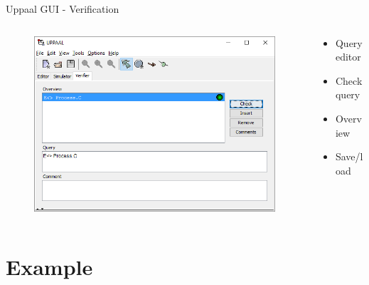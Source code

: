 \documentclass{beamer}
\begin{document}
\begin{frame}{Uppaal GUI - Verification}
	\vspace{-5mm}
	\begin{columns}
		\begin{column}{0.8\textwidth}
			\begin{figure}[H]
				\includegraphics[scale=0.55]{img/uppaal_gui_small_verification.png}
			\end{figure}
		\end{column}
		
		\begin{column}{0.35\textwidth}
			\begin{itemize}
				\item Query editor
				\item Check query
				\item Overview
				\item Save/load
			\end{itemize}
		\end{column}
	\end{columns}		
\end{frame}

\section{Example}
\end{document}
